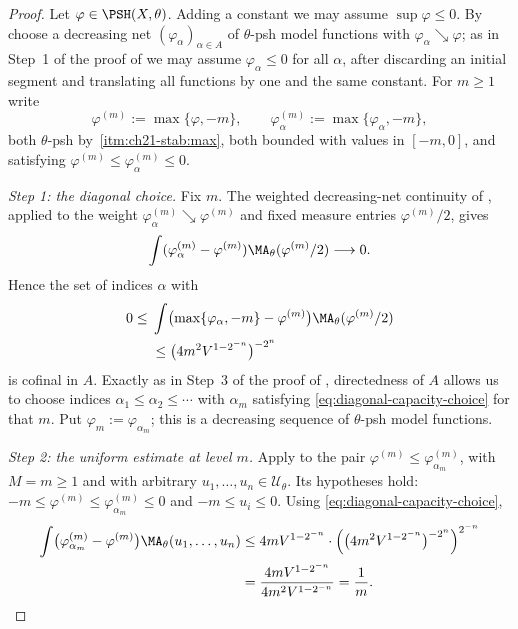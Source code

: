 \begin{proof}
Let $\varphi\in\PSH(X,\theta)$.  Adding a constant we may assume
$\sup\varphi\leq0$.  By  choose a
decreasing net $(\varphi_\alpha)_{\alpha\in A}$ of $\theta$-psh model
functions with $\varphi_\alpha\searrow\varphi$; as in Step~1 of the proof
of  we may assume $\varphi_\alpha\leq0$
for all $\alpha$, after discarding an initial segment and translating all
functions by one and the same constant.  For $m\geq1$ write
\[
 \varphi^{(m)}:=\max\{\varphi,-m\},\qquad
 \varphi^{(m)}_\alpha:=\max\{\varphi_\alpha,-m\} ,
\]
both $\theta$-psh by
\,\cref{itm:ch21-stab:max}, both bounded with values
in $[-m,0]$, and satisfying
$\varphi^{(m)}\leq\varphi^{(m)}_\alpha\leq0$.

\emph{Step 1: the diagonal choice.}  Fix $m$.  The weighted decreasing-net
continuity of , applied to the weight
$\varphi^{(m)}_\alpha\searrow\varphi^{(m)}$ and fixed measure entries
$\varphi^{(m)}/2$, gives
\[
 \int(\varphi^{(m)}_\alpha-\varphi^{(m)})
       \MA_\theta(\varphi^{(m)}/2)\longrightarrow0.
\]
Hence the set of indices $\alpha$ with
\begin{equation}
\label{eq:diagonal-capacity-choice}
\begin{split}
0\leq{}&\int\bigl(\max\{\varphi_{\alpha},-m\}-\varphi^{(m)}\bigr)
               \MA_\theta(\varphi^{(m)}/2)\\
&\leq \bigl(4m^2V^{1-2^{-n}}\bigr)^{-2^n}
\end{split}
\end{equation}
is cofinal in $A$.  Exactly as in Step~3 of the proof of
, directedness of $A$ allows us to choose
indices $\alpha_1\leq\alpha_2\leq\cdots$ with $\alpha_m$ satisfying
\eqref{eq:diagonal-capacity-choice} for that $m$.  Put
$\varphi_m:=\varphi_{\alpha_m}$; this is a decreasing sequence of
$\theta$-psh model functions.

\emph{Step 2: the uniform estimate at level $m$.}  Apply
 to the pair
$\varphi^{(m)}\leq\varphi^{(m)}_{\alpha_m}$, with $M=m\geq1$ and with
arbitrary $u_1,\ldots,u_n\in\mathcal U_\theta$.  Its hypotheses hold:
$-m\leq\varphi^{(m)}\leq\varphi^{(m)}_{\alpha_m}\leq0$ and
$-m\leq u_i\leq0$.  Using \eqref{eq:diagonal-capacity-choice},
\[
 \begin{aligned}
 \int\bigl(\varphi^{(m)}_{\alpha_m}-\varphi^{(m)}\bigr)
       \MA_\theta(u_1,\ldots,u_n)
 &\leq4mV^{1-2^{-n}}\cdot
   \Bigl(\bigl(4m^2V^{1-2^{-n}}\bigr)^{-2^n}\Bigr)^{2^{-n}}
 \\
 &=\frac{4mV^{1-2^{-n}}}{4m^2V^{1-2^{-n}}}
  =\frac1m .
 \end{aligned}
\]


\end{proof}
